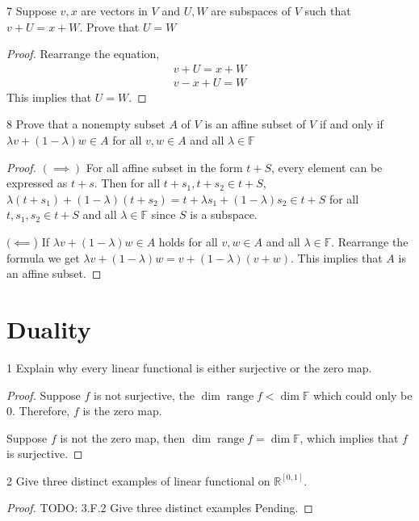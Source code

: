 \documentclass{article}
\newenvironment{problem}[1]{\begin{prob*}{#1}{}}{\end{prob*}}
\DeclareMathOperator{\Range}{range}
\begin{document}
\begin{problem}{7}
Suppose $v,x$ are vectors in $V$ and $U, W$ are subspaces of $V$ such that $v + U = x + W$. Prove that $U = W$
\end{problem}
\begin{proof}
	Rearrange the equation,
	\begin{align*}
		v + U = x + W \\
		v - x + U = W
	\end{align*}
	This implies that $U = W$.
\end{proof}

\begin{problem}{8}
Prove that a nonempty subset $A $ of $V$ is an affine subset of $V$ if and only if
$\lambda v + (1 - \lambda)w \in A$ for all $v, w \in A$ and all $\lambda \in \mathbb{F}$
\end{problem}
\begin{proof}
	$(\implies)$ For all affine subset in the form $t + S$, every element can be expressed as $t + s$. Then for all $t + s_1, t + s_2 \in t + S$, $\lambda (t + s_1) + (1 - \lambda)(t + s_2) = t + \lambda s_1 + (1 - \lambda)s_2 \in t + S$ for all $t, s_1, s_2 \in t + S$ and all $\lambda \in \mathbb{F}$ since $S $ is a subspace. \par
	$(\impliedby$) If $\lambda v + (1 - \lambda)w \in A$ holds for all $v, w \in A$ and all $\lambda \in \mathbb{F}$. Rearrange the formula we get $\lambda v + (1 - \lambda)w = v + (1 - \lambda)(v+w)$. This implies that $A$ is an affine subset.
\end{proof}

\section{Duality}

\begin{problem}{1}
Explain why every linear functional is either surjective or the zero map.
\end{problem}
\begin{proof}
	Suppose $f$ is not surjective, the $\operatorname{dim} \Range f < \operatorname{dim} \mathbb{F}$ which could only be 0. Therefore, $f$ is the zero map. \par
	Suppose $f$ is not the zero map, then $\operatorname{dim} \Range f = \operatorname{dim} \mathbb{F}$, which implies that $f$ is surjective.
\end{proof}

\begin{problem}{2}
Give three distinct examples of linear functional on $\mathbb{R}^{[0,1]}$.
\end{problem}
\begin{proof}
	TODO: 3.F.2 Give three distinct examples Pending.
\end{proof}
\end{document}
